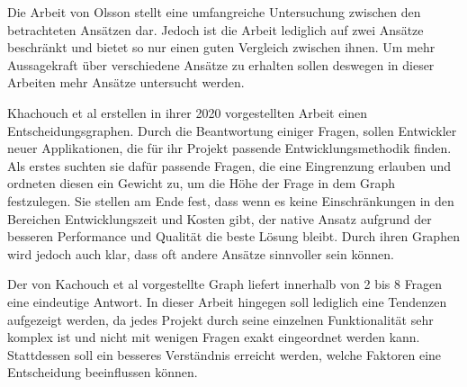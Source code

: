 Die Arbeit von Olsson stellt eine umfangreiche Untersuchung zwischen den betrachteten Ansätzen dar. Jedoch ist die Arbeit lediglich auf zwei Ansätze beschränkt und bietet so nur einen guten Vergleich zwischen ihnen. Um mehr Aussagekraft über verschiedene Ansätze zu erhalten sollen deswegen in dieser Arbeiten mehr Ansätze untersucht werden. 

Khachouch et al \cite{IEEE_Khackouch_Al} erstellen in ihrer 2020 vorgestellten Arbeit einen Entscheidungsgraphen. Durch die Beantwortung einiger Fragen, sollen Entwickler neuer Applikationen, die für ihr Projekt passende Entwicklungsmethodik finden. Als erstes suchten sie dafür passende Fragen, die eine Eingrenzung erlauben und ordneten diesen ein Gewicht zu, um die Höhe der Frage in dem Graph festzulegen. Sie stellen am Ende fest, dass wenn es keine Einschränkungen in den Bereichen Entwicklungszeit und Kosten gibt, der native Ansatz aufgrund der besseren Performance und Qualität die beste Lösung bleibt. Durch ihren Graphen wird jedoch auch klar, dass oft andere Ansätze sinnvoller sein können.

Der von Kachouch et al vorgestellte Graph liefert innerhalb von 2 bis 8 Fragen eine eindeutige Antwort. In dieser Arbeit hingegen soll lediglich eine Tendenzen aufgezeigt werden, da jedes Projekt durch seine einzelnen Funktionalität sehr komplex ist und nicht mit wenigen Fragen exakt eingeordnet werden kann. Stattdessen soll ein besseres Verständnis erreicht werden, welche Faktoren eine Entscheidung beeinflussen können. 